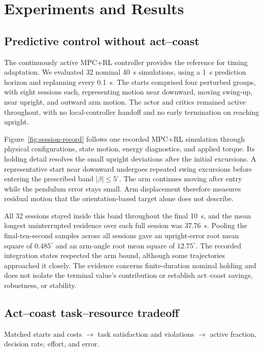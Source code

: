 \documentclass[letterpaper,10pt,conference]{ieeeconf}
\begin{document}
\section{Experiments and Results}
\subsection{Predictive control without act--coast}
\label{sec:results-baseline}
The continuously active MPC+RL controller provides the reference for timing adaptation. We evaluated 32 nominal 40~s simulations, using a 1~s prediction horizon and replanning every 0.1~s. The starts comprised four perturbed groups, with eight sessions each, representing motion near downward, moving swing-up, near upright, and outward arm motion. The actor and critics remained active throughout, with no local-controller handoff and no early termination on reaching upright.

Figure~\ref{fig:session-record} follows one recorded MPC+RL simulation through physical configurations, state motion, energy diagnostics, and applied torque. Its holding detail resolves the small upright deviations after the initial excursions. A representative start near downward undergoes repeated swing excursions before entering the prescribed band $|\beta|\le5^\circ$. The arm continues moving after entry while the pendulum error stays small. Arm displacement therefore measures residual motion that the orientation-based target alone does not describe.

All 32 sessions stayed inside this band throughout the final 10~s, and the mean longest uninterrupted residence over each full session was 37.76~s. Pooling the final-ten-second samples across all sessions gave an upright-error root mean square of $0.485^\circ$ and an arm-angle root mean square of $12.75^\circ$. The recorded integration states respected the arm bound, although some trajectories approached it closely. The evidence concerns finite-duration nominal holding and does not isolate the terminal value's contribution or establish act--coast savings, robustness, or stability.

% 

\subsection{Act--coast task--resource tradeoff}
\label{sec:results-tradeoff}
Matched starts and costs $\rightarrow$ task satisfaction and violations $\rightarrow$ active fraction, decision rate, effort, and error.
\end{document}
